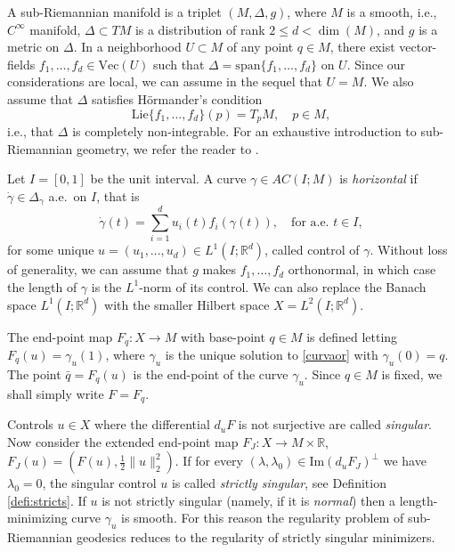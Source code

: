 \documentclass[12pt, reqno]{amsart}
\theoremstyle{plain}
\theoremstyle{definition}
\theoremstyle{remark}
\numberwithin{equation}{section}
\newcommand{\R}{\mathbb{R}}
\newcommand{\0}{\theta}
\newcommand{\g}{\gamma}
\newcommand{\De}{\Delta}
\newcommand{\1}{{-1}}
\newcommand{\q}{\bar q}
\renewcommand{\gg}{\dot{\gamma}}
\renewcommand{\=}{\coloneqq}
\renewcommand{\.}{\dots}
\newcommand{\mr}{\mathrm}
\newcommand{\IM}{\mathrm{Im}}
\newcommand{\be}{\begin{equation}}
\newcommand{\ee}{\end{equation}}
\begin{document}
A sub-Riemannian manifold is a triplet $(M,\De, g)$, where $M$ is a smooth, i.e., $C^\infty$ manifold, $\De\subset TM$ is a distribution of rank $2\leq d<\dim(M)$, and $g$ is a metric on $\De$. In a neighborhood $U\subset M$ of any point  $q\in M$, there exist vector-fields  $f_1,\.,f_d\in \mr{Vec}(U)$   such that $\De=\mr{span}\{f_1,\.,f_d\}$ on $U$. Since our considerations are local, we can assume in the sequel that $U=M$.
We also assume that $\De$ satisfies  H\"ormander's condition  
\begin{equation}\label{eq:horm}
 		\mr{Lie}\{f_1,\.,f_d\}(p)=T_pM, \quad p\in M,
\end{equation}
i.e.,  that $\De$ is completely non-integrable.  For an exhaustive introduction to sub-Riemannian geometry, we refer the reader to \cite{ABB20, AgrSac, B96, J14, Mon02, Rif14}.  



Let $I=[0,1] $ be the unit interval. A curve $\g\in AC(I;M)$ is  \emph{horizontal} if $\gg\in \De_{\g}$ a.e.~on $I$, that is
\be
	\label{curvaor}
 	\gg(t)=\sum_{i=1}^d u_i(t)f_i(\g(t)), \quad \text{for a.e.~$t\in I$} ,
\ee
for some unique $u=(u_1,\.,u_d)\in L^1(I;\R^d)$,  called   control of $\g$. 
Without loss of generality, we can   assume that 
  $g$  makes $f_1,\.,f_d$   orthonormal, in which case   
the length of $\g$ is  the $L^1$-norm of its control. We can also replace the Banach space $L^1(I;\R^d)$ with the smaller Hilbert space $X= L^2(I;\R^d)$.



The end-point map $F_{q}:X\to M$ with base-point $q\in M$ is defined letting  $F_q(u)=\g_u(1)$, where $\g_u$ is the unique solution to \eqref{curvaor} with $\g_u(0)=q$. The point $\q =F_q(u)$ is the end-point of the curve $\g_u$. 
 Since $q\in M$ is fixed, we shall simply write $F=F_{q}$. 
 
 
 {\color{black} Controls $u\in X$ where the differential $d_uF$ is not 
 surjective are called \emph{singular}. Now consider the extended end-point   map $F_J: X\to M\times\R$,
	 $F _J(u) = (F(u), \frac12  \| u\|_2^2 )$. 
If  for every $(\lambda,\lambda_0)\in 
	\IM(d_u F_J  )^\perp$ we have  $\lambda_0=0$, the singular control $u$ is called 
\emph{strictly singular}, see Definition \ref{defi:stricts}.
If $u$ is not strictly singular 	(namely, if it is \emph{normal}) then a length-minimizing
curve  $\gamma_u$ is smooth.
For this reason the regularity problem of sub-Riemannian geodesics reduces to the regularity of strictly singular minimizers.} 
\end{document}
